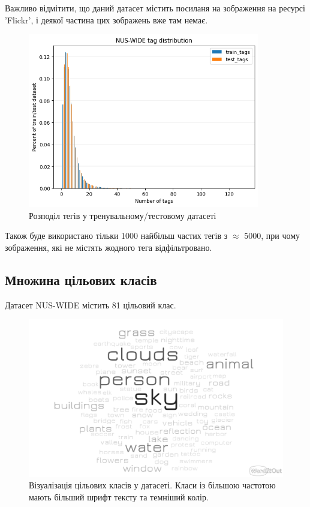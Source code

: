\documentclass{udstu}
\begin{document}
Важливо відмітити, що даний датасет містить посиланя на зображення на ресурсі 'Flickr', і деякої частина цих
зображень вже там немає.

\begin{figure}[!ht]
	\centering
	\includegraphics[width=0.9\textwidth]{PNG/nus-wide-tag-dist}
	\caption{Розподіл тегів у тренувальному/тестовому датасеті}
	\label{figure:nus-wide-dist}
\end{figure}

Також буде використано тільки 1000 найбільш частих тегів з $\approx$ 5000,
при чому зображення, які не містять жодного тега відфільтровано.

\clearpage

\subsection{Множина цільових класів}

Датасет NUS-WIDE \cite{nus-wide-civr09} містить 81 цільовий клас.

\begin{figure}[!ht]
	\centering
	\includegraphics[width=1.0\textwidth]{PNG/nus-wide-label-cloudmap}
	\caption{
	Візуалізація цільових класів у датасеті.
	Класи із більшою частотою мають більший шрифт тексту
	та темніший колір.
	}
	\label{figure:nus-wide-label-cloudmap}
\end{figure}
\end{document}
